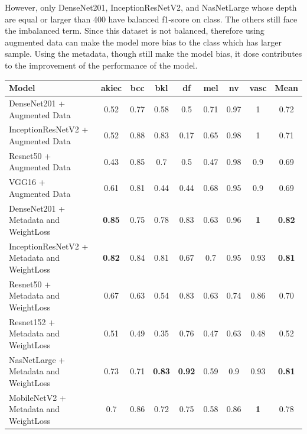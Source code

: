 \documentclass[sensors,article,submit,pdftex,moreauthors]{Definitions/mdpi}
\begin{document}
However, only DenseNet201, InceptionResNetV2, and NasNetLarge whose depth are equal or larger than 400 have balanced f1-score on class. The others still face the imbalanced term. Since this dataset is not balanced, therefore using augmented data can make the model more  bias to the class which has larger sample. Using the metadata, though still make the model bias, it dose contributes to the improvement of  the performance of the model.

\begin{table}[h]
	\centering
	\begin{tabular}{|l | c | c | c | c | c | c | c | c|} 
		\hline
		Model & akiec & bcc & bkl & df & mel & nv & vasc & Mean \\
		\hline
		\thead{DenseNet201 +\\ Augmented Data} & 0.52 & 0.77 & 0.58 & 0.5 & 0.71 & 0.97 & 1 & 0.72\\ 
		\hline
		\thead{InceptionResNetV2 +\\ Augmented Data} & 0.52 & 0.88 & 0.83 & 0.17 & 0.65 & 0.98 & 1 & 0.71\\
		\hline
		\thead{Resnet50 +\\ Augmented Data} & 0.43 & 0.85 & 0.7 & 0.5 & 0.47 & 0.98 & 0.9 & 0.69\\
		\hline 	
		\thead{VGG16 +\\ Augmented Data} & 0.61 & 0.81 & 0.44 & 0.44 & 0.68 & 0.95 & 0.9 & 0.69\\ 
		\hline		
		\thead{DenseNet201 +\\Metadata and WeightLoss} & \textbf{0.85} & 0.75 & 0.78 & 0.83 & 0.63 & 0.96 & \textbf{1} & \textbf{0.82}\\
		\hline
		\thead{InceptionResNetV2 +\\Metadata and WeightLoss} & \textbf{0.82} & 0.84 & 0.81 & 0.67 & 0.7 & 0.95 & 0.93 & \textbf{0.81}\\
		\hline
		\thead{Resnet50 +\\Metadata and WeightLoss} & 0.67 & 0.63 & 0.54 & 0.83 & 0.63 & 0.74 & 0.86 & 0.70\\
		\hline
		\thead{Resnet152 +\\Metadata and WeightLoss} & 0.51 & 0.49 & 0.35 & 0.76 & 0.47 & 0.63 & 0.48 & 0.52\\
		\hline
		\thead{NasNetLarge +\\Metadata and WeightLoss} & 0.73 & 0.71 & \textbf{0.83} & \textbf{0.92} & 0.59 & 0.9 & 0.93 & \textbf{0.81}\\
		\hline
		\thead{MobileNetV2 +\\Metadata and WeightLoss} & 0.7 & 0.86 & 0.72 & 0.75 & 0.58 & 0.86 & \textbf{1} & 0.78\\

\end{tabular}
\end{table}
\end{document}

